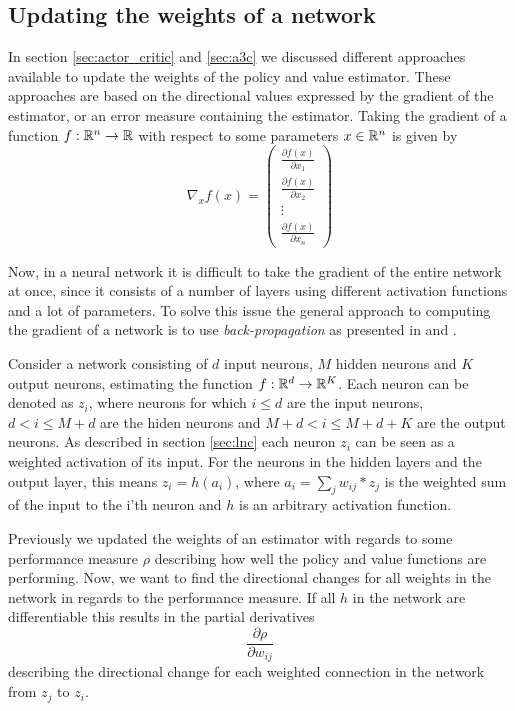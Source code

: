 \documentclass[11pt]{article}
\begin{document}
\subsection{Updating the weights of a network}

In section \ref{sec:actor_critic} and \ref{sec:a3c} we discussed different
approaches available to update the weights of the policy and value estimator.
These approaches are based on the directional values
expressed by the gradient of the estimator, or an error measure containing
the estimator.
Taking the gradient of a function $f : \mathbb{R}^n \to \mathbb{R}$ with respect to
some parameters $x \in \mathbb{R}^n$ is given by
\begin{equation}
    \nabla_x f(x)
    = \begin{pmatrix}
        \frac{\partial f(x)}{\partial x_1}\\
        \frac{\partial f(x)}{\partial x_2}\\
        \vdots\\
        \frac{\partial f(x)}{\partial x_n}
      \end{pmatrix}
\end{equation}

Now, in a neural network it is difficult to take the gradient of the
entire network at once, since it consists of a number of layers
using different activation functions and a lot of parameters.
To solve this issue the general approach to computing the gradient of a network
is to use \textit{back-propagation} as presented in \cite{IgelBackProp}
and \cite{DeepLearningBook}.

Consider a network consisting of $d$ input neurons, $M$ hidden neurons and $K$ output neurons,
estimating the function $f : \mathbb{R}^d \to \mathbb{R}^K$.
Each neuron can be denoted as $z_i$, where neurons for which $i \leq d$ are the input neurons, $d < i \leq M + d$ are the hiden neurons
and $M + d < i \leq M + d + K$ are the output neurons.
As described in section \ref{sec:lnc} each neuron $z_i$ can be seen as a weighted activation of its input.
For the neurons in the hidden layers and the output layer, this means $z_i = h(a_i)$, where 
$a_i = \sum_{j} w_{ij} * z_{j}$ is the weighted sum of the input to the i'th neuron and $h$ is an arbitrary
activation function.

Previously we updated the weights of an estimator with regards to some performance measure $\rho$ 
describing how well the policy and value functions are performing. 
Now, we want to find the directional changes for all weights in the network
in regards to the performance measure.
If all $h$ in the network are differentiable this results in the partial derivatives
\begin{equation}\label{part}
    \frac{\partial \rho}{\partial w_{ij}}
\end{equation}
describing the directional change for each weighted connection in the network from $z_j$ to $z_i$.
\end{document}
